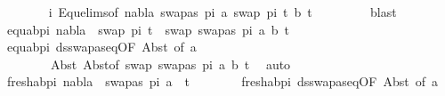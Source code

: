 \begin{isabellebody}
\ \ \ \ \ \ \isamarkupfalse%
\ i\ Equ{\isacharunderscore}{\kern0pt}elims{\isacharparenleft}{\kern0pt}{}{\isacharparenright}{\kern0pt}{\isacharbrackleft}{\kern0pt}of\ nabla\ {\isacartoucheopen}swapas\ pi{}\ a{\isacartoucheclose}\ {\isacartoucheopen}swap\ pi{}\ t{}{\isacharprime}{\kern0pt}{\isacartoucheclose}\ b\ t{}{\isacharprime}{\kern0pt}{\isacharbrackright}{\kern0pt}\ \isanewline
\ \ \ \ \ \ \isamarkupfalse%
\ blast{\isacharplus}{\kern0pt}\isanewline
\ \ \ \ \isamarkupfalse%
\ equ{\isacharunderscore}{\kern0pt}ab{\isacharunderscore}{\kern0pt}pi{}{\isacharcolon}{\kern0pt}\ {\isachardoublequoteopen}nabla\ {\isasymturnstile}\ swap\ pi{}\ t{}{\isacharprime}{\kern0pt}\ {\isasymapprox}\ swap\ {\isacharbrackleft}{\kern0pt}{\isacharparenleft}{\kern0pt}swapas\ pi{}\ a{\isacharcomma}{\kern0pt}\ b{\isacharparenright}{\kern0pt}{\isacharbrackright}{\kern0pt}\ t{}{\isacharprime}{\kern0pt}{\isachardoublequoteclose}\isanewline
\ \ \ \ \ \ \isamarkupfalse%
\ equ{\isacharunderscore}{\kern0pt}ab{\isacharunderscore}{\kern0pt}pi{}\ ds{\isacharunderscore}{\kern0pt}swapas{\isacharunderscore}{\kern0pt}eq{\isacharbrackleft}{\kern0pt}OF\ Abst{\isacharparenleft}{\kern0pt}{}{\isacharparenright}{\kern0pt}{\isacharcomma}{\kern0pt}\ of\ a{\isacharbrackright}{\kern0pt}\ \isanewline
\ \ \ \ \ \ \ \ Abst{\isacharparenleft}{\kern0pt}{}{\isacharparenright}{\kern0pt}\ Abst{\isacharparenleft}{\kern0pt}{}{\isacharparenright}{\kern0pt}{\isacharbrackleft}{\kern0pt}of\ {\isacartoucheopen}swap\ {\isacharbrackleft}{\kern0pt}{\isacharparenleft}{\kern0pt}swapas\ pi{}\ a{\isacharcomma}{\kern0pt}\ b{\isacharparenright}{\kern0pt}{\isacharbrackright}{\kern0pt}\ t{}{\isacharprime}{\kern0pt}{\isacartoucheclose}{\isacharbrackright}{\kern0pt}\ \isamarkupfalse%
\ auto\isanewline
\ \ \ \ \isamarkupfalse%
\ fresh{\isacharunderscore}{\kern0pt}ab{\isacharunderscore}{\kern0pt}pi{}{\isacharcolon}{\kern0pt}\ {\isachardoublequoteopen}nabla\ {\isasymturnstile}\ swapas\ pi{}\ a\ {\isasymsharp}\ t{}{\isacharprime}{\kern0pt}{\isachardoublequoteclose}\isanewline
\ \ \ \ \ \ \isamarkupfalse%
\ fresh{\isacharunderscore}{\kern0pt}ab{\isacharunderscore}{\kern0pt}pi{}\ ds{\isacharunderscore}{\kern0pt}swapas{\isacharunderscore}{\kern0pt}eq{\isacharbrackleft}{\kern0pt}OF\ Abst{\isacharparenleft}{\kern0pt}{}{\isacharparenright}{\kern0pt}{\isacharcomma}{\kern0pt}\ of\ a{\isacharbrackright}{\kern0pt}\ \isamarkupfalse%

\end{isabellebody}
